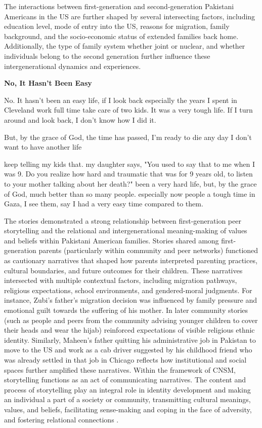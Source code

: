The interactions between first-generation and second-generation Pakistani Americans in the US are further shaped by several intersecting factors, including education level, mode of entry into the US, reasons for migration, family background, and the socio-economic status of extended families back home. Additionally, the type of family system whether joint or nuclear, and whether individuals belong to the second generation further influence these intergenerational dynamics and experiences.

\textbf{No, It Hasn't Been Easy}

\begin{FoundPoem}
No.
It hasn't been an easy life, if I look back
especially the years I spent in Cleveland
work full time
take care of two kids.
It was a very tough life.
If I turn around and look back,
I don't know how I did it.

But, by the grace of God,
the time has passed,
I'm ready to die any day
I don't want to have another life

 keep telling my kids that.
my daughter says,
"You used to say that to me when I was 9.
Do you realize how hard and traumatic that was for 9 years old,
 to listen to your mother talking about her death?"
been a very hard life,	
 but,		 by the grace of God,
much better 	than					 so many people.
especially now
people 		a tough time in Gaza,
I see them,	 say		I had a very easy time
compared to them.
\end{FoundPoem}

The stories demonstrated a strong relationship between first-generation peer storytelling and the relational and intergenerational meaning-making of values and beliefs within Pakistani American families. Stories shared among first-generation parents (particularly within community and peer networks) functioned as cautionary narratives that shaped how parents interpreted parenting practices, cultural boundaries, and future outcomes for their children. These narratives intersected with multiple contextual factors, including migration pathways, religious expectations, school environments, and gendered-moral judgments. For instance, Zubi’s father’s migration decision was influenced by family pressure and emotional guilt towards the suffering of his mother. In later community stories (such as people and peers from the community advising younger children to cover their heads and wear the hijab) reinforced expectations of visible religious ethnic identity. Similarly, Maheen’s father quitting his administrative job in Pakistan to move to the US and work as a cab driver suggested by his childhood friend who was already settled in that job in Chicago reflects how institutional and social spaces further amplified these narratives. Within the framework of CNSM, storytelling functions as an act of communicating narratives. The content and process of storytelling play an integral role in identity development and making an individual a part of a society or community, transmitting cultural meanings, values, and beliefs, facilitating sense-making and coping in the face of adversity, and fostering relational connections \citep{koenigkellasFamilyStoriesStorytelling2012, koenigkellasCommunicatedNarrativeSenseMaking2022}.

